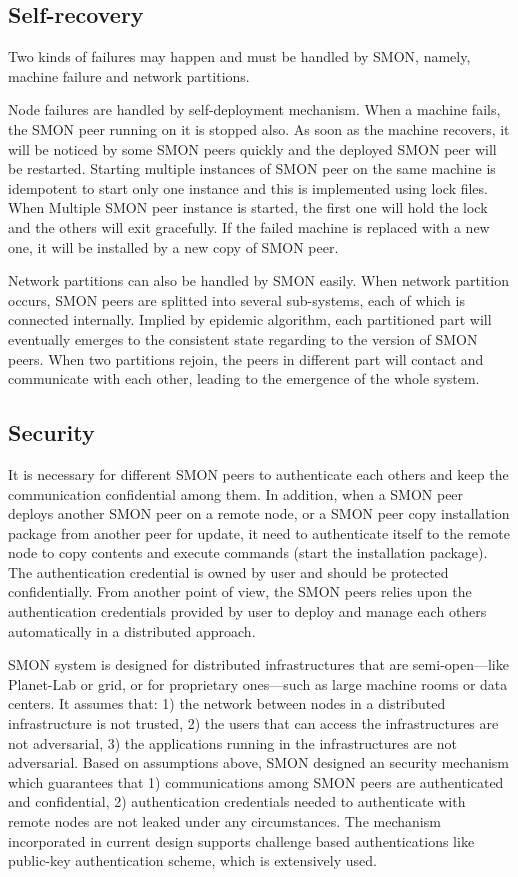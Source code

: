 \subsection{Self-recovery}

Two kinds of failures may happen and must be handled by SMON,
namely, machine failure and network partitions.

Node failures are handled by self-deployment mechanism.
When a machine fails, the SMON peer running on it is stopped
also.  As soon as the machine recovers, it will be noticed
by some SMON peers quickly and the deployed SMON peer will
be restarted. Starting multiple instances of SMON peer on
the same machine is idempotent to start only one instance
and this is implemented using lock files. When Multiple SMON
peer instance is started, the first one will hold the lock
and the others will exit gracefully.  If the failed machine
is replaced with a new one, it will be installed by a new
copy of SMON peer.

Network partitions can also be handled by SMON easily. When
network partition occurs, SMON peers are splitted into
several sub-systems, each of which is connected internally.
Implied by epidemic algorithm, each partitioned part will
eventually emerges to the consistent state regarding to the
version of SMON peers. When two partitions rejoin, the peers
in different part will contact and communicate with each
other, leading to the emergence of the whole system.

\subsection{Security}
\label{subsec:security}

It is necessary for different SMON peers to authenticate
each others and keep the communication confidential among
them. In addition, when a SMON peer deploys another SMON
peer on a remote node, or a SMON peer copy installation
package from another peer for update, it need to
authenticate itself to the remote node to copy contents and
execute commands (start the installation package).  The
authentication credential is owned by user and should be
protected confidentially. From another point of view, the
SMON peers relies upon the authentication credentials
provided by user to deploy and manage each others
automatically in a distributed approach. 

SMON system is designed for distributed infrastructures that
are semi-open---like Planet-Lab or grid, or for proprietary
ones---such as large machine rooms or data centers. It
assumes that: 1) the network between nodes in a distributed
infrastructure is not trusted, 2) the users that can access
the infrastructures are not adversarial, 3) the applications
running in the infrastructures are not adversarial. Based on
assumptions above, SMON designed an security mechanism which
guarantees that 1) communications among SMON peers are
authenticated and confidential, 2) authentication
credentials needed to authenticate with remote nodes are not
leaked under any circumstances. The mechanism incorporated
in current design supports challenge based authentications
like public-key authentication scheme, which is extensively
used.


